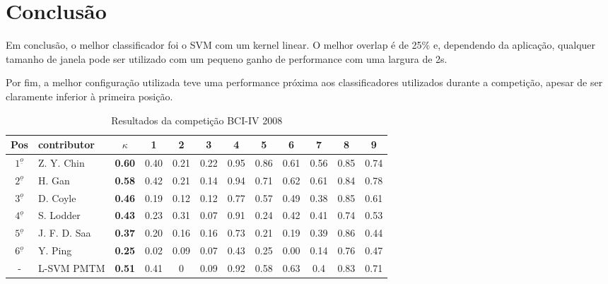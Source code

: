 \chapter{Conclusão} \label{lab_conclusao}
\par
Em conclus\~ao, o melhor classificador foi o SVM com um kernel linear. O melhor overlap é de 25\% e, dependendo da aplica\c{c}\~ao, qualquer tamanho de janela pode ser utilizado com um pequeno ganho de performance com uma largura de 2s. 
\par
Por fim, a melhor configura\c{c}\~ao utilizada teve uma performance pr\'oxima aos classificadores utilizados durante a competi\c{c}\~ao, apesar de ser claramente inferior \`a primeira posi\c{c}\~ao. 
\begin{table}[h!]
	\centering
	\caption{Resultados da competi\c{c}\~ao BCI-IV 2008}
	\begin{tabularx}{\textwidth}{c|X|c|c|c|c|c|c|c|c|c|c}		
		\hline\hline
		Pos&contributor&$\kappa$&1&2&3&4&5&6&7&8&9  \\ \hline
		$1^{\underline{o}}$&Z. Y. Chin&\textbf{0.60}&0.40&0.21&0.22&	0.95&0.86&0.61&0.56&0.85&0.74 \\ \hline 
		$2^{\underline{o}}$&H. Gan&\textbf{0.58}&0.42&0.21&0.14&0.94&0.71 &0.62&0.61&0.84&0.78 \\ \hline
		$3^{\underline{o}}$&D. Coyle&\textbf{0.46}&0.19&0.12&0.12 &0.77&0.57&0.49&0.38&0.85&0.61 \\ \hline
		$4^{\underline{o}}$&S. Lodder&\textbf{0.43}&0.23&0.31&0.07&0.91& 	0.24&0.42&0.41&0.74&0.53 \\ \hline
		$5^{\underline{o}}$&J. F. D. Saa&\textbf{0.37}&0.20&0.16&0.16&0.73&0.21&0.19&0.39&0.86&0.44 \\ \hline
		$6^{\underline{o}}$&Y. Ping&\textbf{0.25}&0.02&0.09&0.07&0.43&0.25&0.00&0.14&0.76&0.47\\ \hline\hline
		-&L-SVM PMTM&\textbf{0.51}&0.41&0&0.09&0.92&0.58&0.63&0.4&0.83&0.71\\ \hline
	\end{tabularx}
	\label{Tab:BCI2008}
\end{table}


